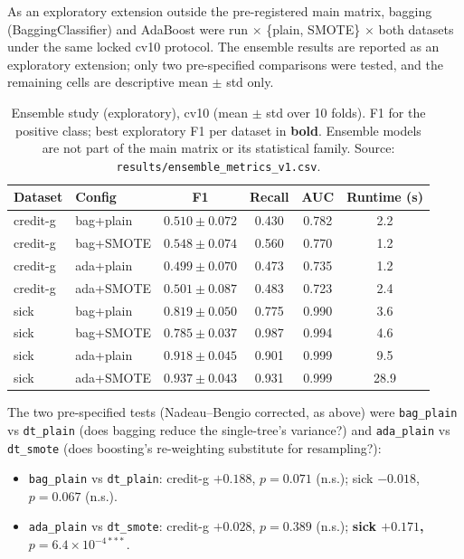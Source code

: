 As an exploratory extension outside the pre-registered main matrix, bagging (BaggingClassifier) and AdaBoost were run $\times$ \{plain, SMOTE\} $\times$ both datasets under the same locked cv10 protocol. The ensemble results are reported as an exploratory extension; only two pre-specified comparisons were tested, and the remaining cells are descriptive mean $\pm$ std only.

\begin{table}[H]
\centering
\caption{Ensemble study (exploratory), cv10 (mean $\pm$ std over 10 folds). F1 for the positive class; best exploratory F1 per dataset in \textbf{bold}. Ensemble models are not part of the main matrix or its statistical family. Source: \texttt{results/ensemble\_metrics\_v1.csv}.}
\label{tab:ensemble}
\begin{tabular}{llcccc}
\toprule
Dataset & Config & F1 & Recall & AUC & Runtime (s) \\
\midrule
credit-g & bag+plain & $0.510\pm0.072$ & 0.430 & 0.782 & 2.2 \\
credit-g & bag+SMOTE & $0.548\pm0.074$ & 0.560 & 0.770 & 1.2 \\
credit-g & ada+plain & $0.499\pm0.070$ & 0.473 & 0.735 & 1.2 \\
credit-g & ada+SMOTE & $0.501\pm0.087$ & 0.483 & 0.723 & 2.4 \\
\midrule
sick & bag+plain & $0.819\pm0.050$ & 0.775 & 0.990 & 3.6 \\
sick & bag+SMOTE & $0.785\pm0.037$ & 0.987 & 0.994 & 4.6 \\
sick & ada+plain & $0.918\pm0.045$ & 0.901 & 0.999 & 9.5 \\
sick & ada+SMOTE & $\mathbf{0.937\pm0.043}$ & 0.931 & 0.999 & 28.9 \\
\bottomrule
\end{tabular}
\end{table}

The two pre-specified tests (Nadeau--Bengio corrected, as above) were \texttt{bag\_plain} vs \texttt{dt\_plain} (does bagging reduce the single-tree's variance?) and \texttt{ada\_plain} vs \texttt{dt\_smote} (does boosting's re-weighting substitute for resampling?):

\begin{itemize}
  \item \texttt{bag\_plain} vs \texttt{dt\_plain}: credit-g $+0.188$, $p=0.071$ (n.s.); sick $-0.018$, $p=0.067$ (n.s.).
  \item \texttt{ada\_plain} vs \texttt{dt\_smote}: credit-g $+0.028$, $p=0.389$ (n.s.); \textbf{sick $+0.171$, $p=6.4\times10^{-4***}$}.
\end{itemize}

